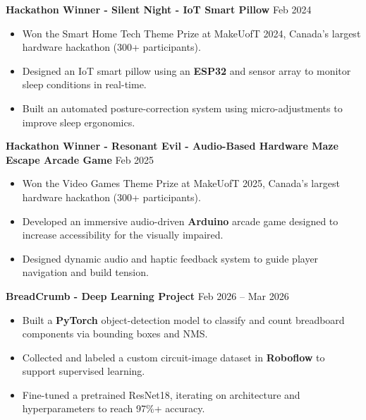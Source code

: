 \documentclass[10pt,letterpaper]{article}
\begin{document}
\textbf{Hackathon Winner - Silent Night - IoT Smart Pillow} \hfill Feb 2024 \\
\begin{itemize}
    \item Won the Smart Home Tech Theme Prize at MakeUofT 2024, Canada's largest hardware hackathon (300+ participants).  
    \item Designed an IoT smart pillow using an \textbf{ESP32} and sensor array to monitor sleep conditions in real-time.
    \item Built an automated posture-correction system using micro-adjustments to improve sleep ergonomics. 
\end{itemize}

\textbf{Hackathon Winner - Resonant Evil - Audio-Based Hardware Maze Escape Arcade Game} \hfill Feb 2025 \\
\begin{itemize}
    \item Won the Video Games Theme Prize at MakeUofT 2025, Canada's largest hardware hackathon (300+ participants). 
    \item Developed an immersive audio-driven \textbf{Arduino} arcade game designed to increase accessibility for the visually impaired.
    \item Designed dynamic audio and haptic feedback system to guide player navigation and build tension. 
\end{itemize}

\textbf{BreadCrumb - Deep Learning Project} \hfill Feb 2026 -- Mar 2026 \\
\begin{itemize}
    \item Built a \textbf{PyTorch} object-detection model to classify and count breadboard components via bounding boxes and NMS.
    \item Collected and labeled a custom circuit-image dataset in \textbf{Roboflow} to support supervised learning.
    \item Fine-tuned a pretrained ResNet18, iterating on architecture and hyperparameters to reach 97\%+ accuracy.
\end{itemize}



\end{document}
